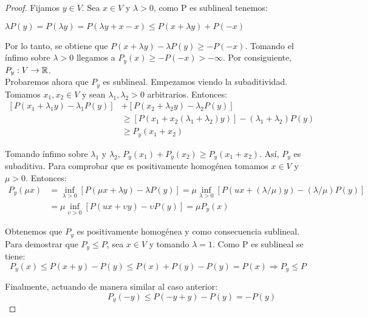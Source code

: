 	\begin{proof}
		Fijamos $ y \in V $. Sea $ x \in V $ y $ \lambda > 0$, como P es sublineal tenemos: 
		\begin{center}
			$ \lambda P(y) = P(\lambda y) =P(\lambda y +x-x) \leq P(x+\lambda y)+ P(-x)$
		\end{center}
		
		Por lo tanto, se obtiene que $ P(x+\lambda y) - \lambda P(y) \geq -P(-x) $.  Tomando el ínfimo sobre $ \lambda >0 $ llegamos a $ P_{y}(x)\geq -P(-x) > -\infty$. Por consiguiente, $ P_y:V \rightarrow \mathbb{R}$. \\
		
		Probaremos ahora que $ P_y $ es sublineal. Empezamos viendo la subaditividad. Tomamos $ x_1, x_2 \in V $ y sean $ \lambda_1, \lambda_2 > 0$ arbitrarios. Entonces: 
		\begin{equation*}
		\begin{split}
		\left[ P(x_1 + \lambda_1 y) - \lambda_1 P(y) \right] &+ \left[ P(x_2 + \lambda_2 y) - \lambda_2 P(y) \right] \\
		& \geq \left[ P(x_1 + x_2 (\lambda_1+\lambda_2)y) \right] - (\lambda_1+\lambda_2) P(y) \\
		&\geq P_y (x_1 + x_2 )
		\end{split}
		\end{equation*}
		
		Tomando ínfimo sobre $ \lambda_1 $ y $ \lambda_2 $, $  P_y (x_1)  + P_y (x_2 ) \geq P_y (x_1 + x_2 ) $. Así, $ P_y $ es subaditiva. Para comprobar que es positivamente homogénea tomamos $ x \in V $ y $ \mu > 0 $. Entonces:
		\begin{equation*}
		\begin{split}
		P_y (\mu x) &= \inf_{\lambda > 0} \left[P(\mu x+\lambda y) - \lambda P(y)\right] = \mu \inf_{\lambda > 0} \left[P(u x+ (\lambda / \mu) y) - (\lambda / \mu) P(y)\right] \\
		&= \mu \inf_{\upsilon > 0} \left[P(u x+ \upsilon y) - \upsilon  P(y)\right] = \mu P_y (x)
		\end{split}
		\end{equation*}
		
		Obtenemos que $ P_y $ es positivamente homogénea y como consecuencia sublineal. \\
		
		Para demostrar que $ P_y \leq P $, sea $ x \in V $ y tomando $ \lambda = 1 $. Como P es sublineal se tiene: 
		\[ P_y(x) \leq P(x+y) - P(y) \leq P(x)+ P(y) - P(y) = P(x) \Longrightarrow P_y \leq P  \]
		
		Finalmente, actuando de manera similar al caso anterior:
		\[ \qquad \qquad \qquad \qquad P_y(-y) \leq P(-y+y) - P(y) = -P(y)  \]
		
	\end{proof}
	

